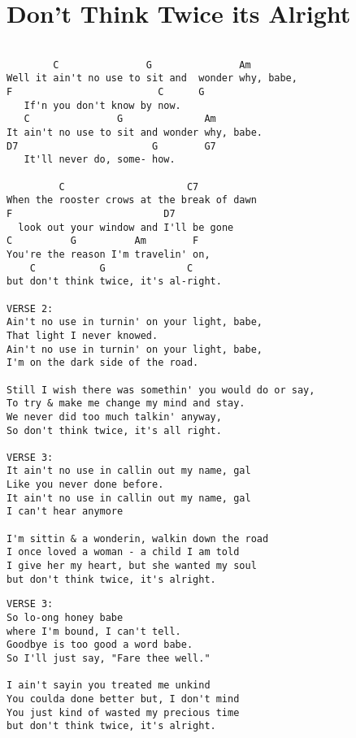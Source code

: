 \documentclass[leqno]{memoir}
\begin{document}
\chapter{Don't Think Twice its Alright}
\begin{verbatim}

        C               G               Am
Well it ain't no use to sit and  wonder why, babe,
F                         C      G
   If'n you don't know by now.       
   C               G              Am
It ain't no use to sit and wonder why, babe.
D7                       G        G7
   It'll never do, some- how.

         C                     C7
When the rooster crows at the break of dawn
F                          D7
  look out your window and I'll be gone
C          G          Am        F
You're the reason I'm travelin' on,
    C           G              C
but don't think twice, it's al-right.

VERSE 2:
Ain't no use in turnin' on your light, babe,
That light I never knowed.
Ain't no use in turnin' on your light, babe,
I'm on the dark side of the road.

Still I wish there was somethin' you would do or say,
To try & make me change my mind and stay.
We never did too much talkin' anyway,
So don't think twice, it's all right.

VERSE 3:
It ain't no use in callin out my name, gal
Like you never done before.
It ain't no use in callin out my name, gal
I can't hear anymore

I'm sittin & a wonderin, walkin down the road
I once loved a woman - a child I am told
I give her my heart, but she wanted my soul
but don't think twice, it's alright.
\end{verbatim}
\newpage
\begin{verbatim}
VERSE 3:
So lo-ong honey babe
where I'm bound, I can't tell.
Goodbye is too good a word babe.
So I'll just say, "Fare thee well."

I ain't sayin you treated me unkind
You coulda done better but, I don't mind
You just kind of wasted my precious time
but don't think twice, it's alright.

\end{verbatim}
\newpage
\end{document}
